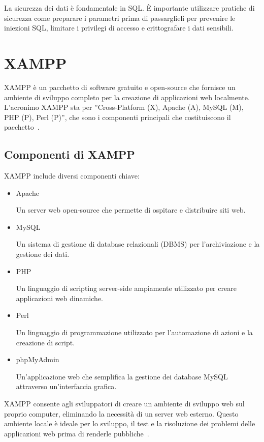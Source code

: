 La sicurezza dei dati è fondamentale in SQL. È importante utilizzare pratiche di sicurezza come preparare i parametri prima di passarglieli per prevenire le iniezioni SQL, limitare i privilegi di accesso e crittografare i dati sensibili.

\section{XAMPP}
XAMPP è un pacchetto di software gratuito e open-source che fornisce un ambiente di sviluppo completo per la creazione di applicazioni web localmente. L'acronimo XAMPP sta per ”Cross-Platform (X), Apache (A), MySQL (M), PHP (P), Perl (P)”, che sono i componenti principali che costituiscono il pacchetto~\cite{XAMPP}.

\subsection{Componenti di XAMPP}
XAMPP include diversi componenti chiave:

\begin{itemize}
    \item Apache
    
    Un server web open-source che permette di ospitare e distribuire siti web.

    \item MySQL
    
    Un sistema di gestione di database relazionali (DBMS) per l'archiviazione e la gestione dei dati.

    \item PHP
    
    Un linguaggio di scripting server-side ampiamente utilizzato per creare applicazioni web dinamiche.

    \item Perl
    
    Un linguaggio di programmazione utilizzato per l'automazione di azioni e la creazione di script.

    \item phpMyAdmin
    
    Un'applicazione web che semplifica la gestione dei database MySQL attraverso un'interfaccia grafica.
\end{itemize}

XAMPP consente agli sviluppatori di creare un ambiente di sviluppo web sul proprio computer, eliminando la necessità di un server web esterno. Questo ambiente locale è ideale per lo sviluppo, il test e la risoluzione dei problemi delle applicazioni web prima di renderle pubbliche~\cite{XAMPP, ALL_WEB}.

